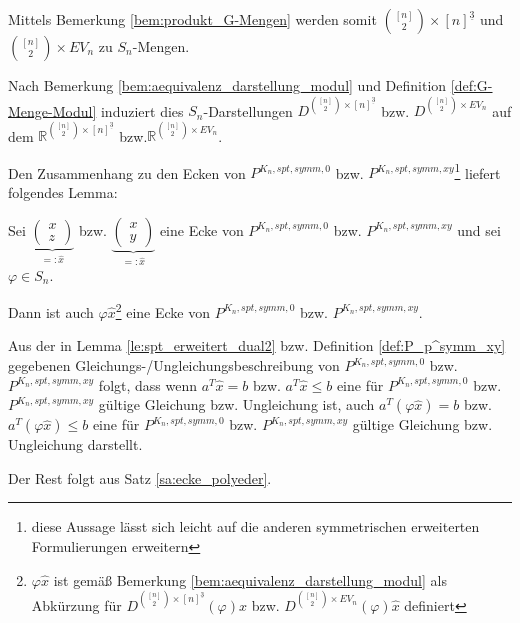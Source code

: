 \documentclass[10p,a4paper,BCOR = 12mm, DIV=15]{scrbook}
\begin{document}
Mittels Bemerkung \ref{bem:produkt_G-Mengen} werden somit ${\left[n\right] \choose 2} \times \left[n\right]^{\underline{3}}$ und ${\left[n\right] \choose 2} \times EV_n$ zu $S_n$-Mengen.

Nach Bemerkung \ref{bem:aequivalenz_darstellung_modul} und Definition \ref{def:G-Menge-Modul} induziert dies $S_n$-Darstellungen $D^{{\left[n\right] \choose 2} \times \left[n\right]^{\underline{3}}}$ bzw. $D^{{\left[n\right] \choose 2} \times EV_n}$
auf dem $\mathbb{R}^{{\left[n\right] \choose 2} \times \left[n\right]^{\underline{3}}}$ bzw.$\mathbb{R}^{{\left[n\right] \choose 2} \times EV_n}$.

Den Zusammenhang zu den Ecken von $P^{K_n, spt, symm, 0}$ bzw. $P^{K_n, spt, symm, xy}$\footnote{diese Aussage lässt sich leicht auf die anderen symmetrischen erweiterten Formulierungen erweitern} liefert folgendes Lemma:

\begin{Le}
Sei $\underbrace{\left(
\begin{array}{c}
x \\
z
\end{array}
\right)}_{=: \widehat{x}}$ bzw. $\underbrace{\left(
\begin{array}{c}
x \\
y
\end{array}
\right)}_{=: \widehat{x}}$ eine Ecke von $P^{K_n, spt, symm, 0}$ bzw. $P^{K_n, spt, symm, xy}$ und sei $\varphi \in S_n$.

Dann ist auch $\varphi \widehat{x}$\footnote{$\varphi \widehat{x}$ ist gemäß Bemerkung \ref{bem:aequivalenz_darstellung_modul} als Abkürzung für $D^{{\left[n\right] \choose 2} \times \left[n\right]^{\underline{3}}}\left(\varphi\right) \widehat{x}$ bzw. $D^{{\left[n\right] \choose 2} \times EV_n}\left(\varphi\right) \widehat{x}$ definiert} eine Ecke von $P^{K_n, spt, symm, 0}$ bzw. $P^{K_n, spt, symm, xy}$.
\end{Le}
\begin{bew}
Aus der in Lemma \ref{le:spt_erweitert_dual2} bzw. Definition \ref{def:P_p^symm_xy} gegebenen Gleichungs-/Unglei\-chungs\-beschrei\-bung von $P^{K_n, spt, symm, 0}$ bzw. $P^{K_n, spt, symm, xy}$ folgt, dass wenn $a^T \widehat{x} = b$ bzw. $a^T \widehat{x} \leq b$ eine für $P^{K_n, spt, symm, 0}$ bzw. $P^{K_n, spt, symm, xy}$ gültige Gleichung bzw. Ungleichung ist, auch $a^T \left(\varphi \widehat{x}\right) = b$ bzw. $a^T \left(\varphi \widehat{x}\right) \leq b$ eine für $P^{K_n, spt, symm, 0}$ bzw. $P^{K_n, spt, symm, xy}$ gültige Gleichung bzw. Ungleichung darstellt.

Der Rest folgt aus Satz \ref{sa:ecke_polyeder}.
\end{bew}
\end{document}
